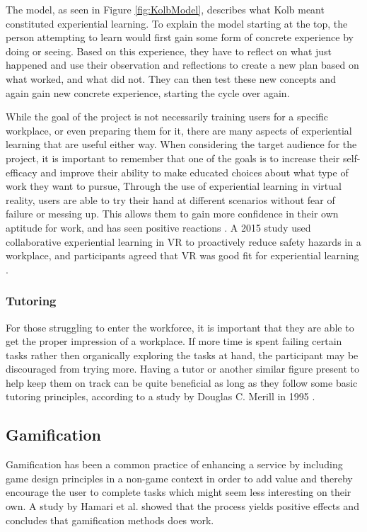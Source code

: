 The model, as seen in Figure \ref{fig:KolbModel}, describes what Kolb meant constituted experiential learning. To explain the model starting at the top, the person attempting to learn would first gain some form of concrete experience by doing or seeing. Based on this experience, they have to reflect on what just happened and use their observation and reflections to create a new plan based on what worked, and what did not. They can then test these new concepts and again gain new concrete experience, starting the cycle over again.

While the goal of the project is not necessarily training users for a specific workplace, or even preparing them for it, there are many aspects of experiential learning that are useful either way. When considering the target audience for the project, it is important to remember that one of the goals is to increase their self-efficacy and improve their ability to make educated choices about what type of work they want to pursue, Through the use of experiential learning in virtual reality, users are able to try their hand at different scenarios without fear of failure or messing up. This allows them to gain more confidence in their own aptitude for work, and has seen positive reactions \cite{fominykh2019immersive} \cite{prasolova2019empowering}. A 2015 study used collaborative experiential learning in VR to proactively reduce safety hazards in a workplace, and participants agreed that VR was good fit for experiential learning \cite{le2015social}.

\subsubsection{Tutoring}
For those struggling to enter the workforce, it is important that they are able to get the proper impression of a workplace. If more time is spent failing certain tasks rather then organically exploring the tasks at hand, the participant may be discouraged from trying more. Having a tutor or another similar figure present to help keep them on track can be quite beneficial as long as they follow some basic tutoring principles, according to a study by Douglas C. Merill in 1995 \cite{merrill1995tutoring}.

\subsection{Gamification}
Gamification has been a common practice of enhancing a service by including game design principles in a non-game context in order to add value and thereby encourage the user to complete tasks which might seem less interesting on their own. A study by Hamari et al. \cite{hamari2014does} showed that the process yields positive effects and concludes that gamification methods does work.

